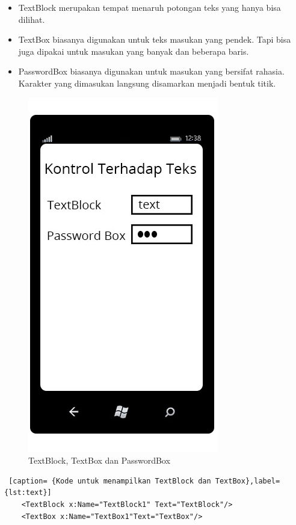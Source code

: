 \begin{itemize}
	\item TextBlock merupakan tempat menaruh potongan teks yang hanya bisa dilihat.
	\item TextBox biasanya digunakan untuk teks masukan yang pendek. Tapi bisa juga dipakai untuk masukan yang banyak dan beberapa baris.
	\item PasswordBox biasanya digunakan untuk masukan yang bersifat rahasia. Karakter yang dimasukan langsung disamarkan menjadi bentuk titik.
\end{itemize}

\begin{figure}[h]
	\centering
		\includegraphics[scale=0.5]{Gambar/Tombol/kontrol_teks}
	\caption{TextBlock, TextBox dan PasswordBox}
	\label{fig:kontrol_teks}
\end{figure}

\begin{lstlisting} [caption= {Kode untuk menampilkan TextBlock dan TextBox},label={lst:text}]
	<TextBlock x:Name="TextBlock1" Text="TextBlock"/>
	<TextBox x:Name="TextBox1"Text="TextBox"/>
\end{lstlisting}

